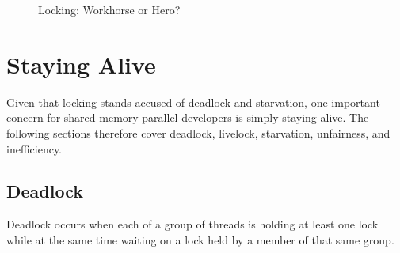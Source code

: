 \begin{figure}[tb]
\centering
{}
\caption{Locking: Workhorse or Hero?}
\end{figure}

\section{Staying Alive}
\label{sec:locking:Staying Alive}

Given that locking stands accused of deadlock and starvation,
one important concern for shared-memory parallel developers is
simply staying alive.
The following sections therefore cover deadlock, livelock, starvation,
unfairness, and inefficiency.

\subsection{Deadlock}
\label{sec:locking:Deadlock}

Deadlock occurs when each of a group of threads is holding at least one
lock while at the same time waiting on a lock held by a member
of that same group.

